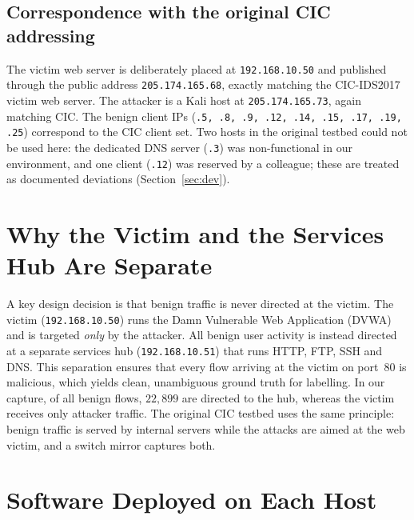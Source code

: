 \documentclass[11pt]{article}
\begin{document}
\subsection{Correspondence with the original CIC addressing}
The victim web server is deliberately placed at \texttt{192.168.10.50} and
published through the public address \texttt{205.174.165.68}, exactly matching the
CIC-IDS2017 victim web server. The attacker is a Kali host at
\texttt{205.174.165.73}, again matching CIC. The benign client IPs
(\texttt{.5, .8, .9, .12, .14, .15, .17, .19, .25}) correspond to the CIC client
set. Two hosts in the original testbed could not be used here: the dedicated DNS
server (\texttt{.3}) was non-functional in our environment, and one client
(\texttt{.12}) was reserved by a colleague; these are treated as documented
deviations (Section~\ref{sec:dev}).

\section{Why the Victim and the Services Hub Are Separate}
A key design decision is that benign traffic is never directed at the victim.
The victim (\texttt{192.168.10.50}) runs the Damn Vulnerable Web Application
(DVWA) and is targeted \emph{only} by the attacker. All benign user activity is
instead directed at a separate services hub (\texttt{192.168.10.51}) that runs
HTTP, FTP, SSH and DNS. This separation ensures that every flow arriving at the
victim on port~80 is malicious, which yields clean, unambiguous ground truth for
labelling. In our capture, of all benign flows, $22{,}899$ are directed to the
hub, whereas the victim receives only attacker traffic. The original CIC testbed
uses the same principle: benign traffic is served by internal servers while the
attacks are aimed at the web victim, and a switch mirror captures both.

\section{Software Deployed on Each Host}
\end{document}
